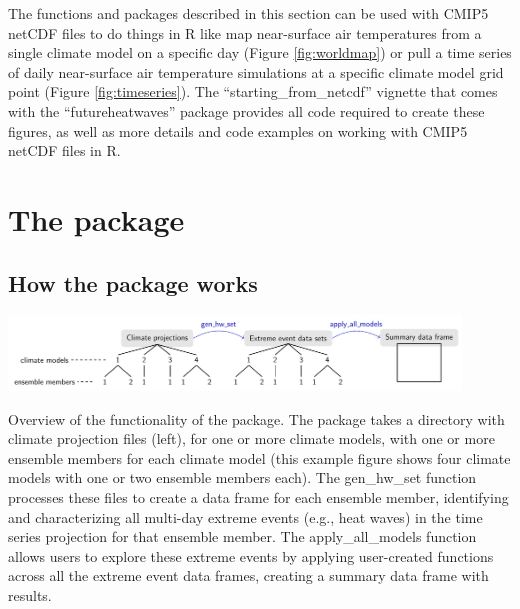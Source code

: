 The functions and packages described in this section can be used with
CMIP5 netCDF files to do things in R like map near-surface air
temperatures from a single climate model on a specific day (Figure
\ref{fig:worldmap}) or pull a time series of daily near-surface air
temperature simulations at a specific climate model grid point (Figure
\ref{fig:timeseries}). The ``starting\_from\_netcdf'' vignette that
comes with the ``futureheatwaves'' package provides all code required to
create these figures, as well as more details and code examples on
working with CMIP5 netCDF files in R.

\section{\texorpdfstring{The 
package}{The  package}}\label{the-package}

\subsection{How the package works}\label{how-the-package-works}

\begin{widefigure}
\includegraphics[width = 0.9\textwidth]{OverviewFigure}
\caption{Overview of the functionality of the  package. The package takes a directory with climate projection files (left), for one or more climate models, with one or more ensemble members for each climate model (this example figure shows four climate models with one or two ensemble members each). The gen\_hw\_set function processes these files to create a data frame for each ensemble member, identifying and characterizing all multi-day extreme events (e.g., heat waves) in the time series projection for that ensemble member. The apply\_all\_models function allows users to explore these extreme events by applying user-created functions across all the extreme event data frames, creating a summary data frame with results.}
\label{fig:overview}
\end{widefigure}

